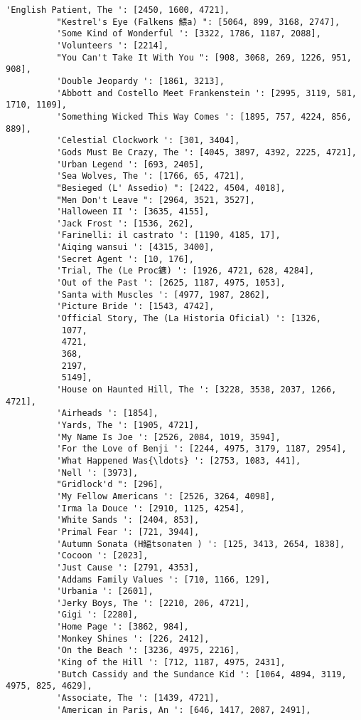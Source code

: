 \documentclass[11pt]{article}
\begin{document}
\begin{Verbatim}[commandchars=\\\{\}]
          'English Patient, The ': [2450, 1600, 4721],
          "Kestrel's Eye (Falkens 鰃a) ": [5064, 899, 3168, 2747],
          'Some Kind of Wonderful ': [3322, 1786, 1187, 2088],
          'Volunteers ': [2214],
          "You Can't Take It With You ": [908, 3068, 269, 1226, 951, 908],
          'Double Jeopardy ': [1861, 3213],
          'Abbott and Costello Meet Frankenstein ': [2995, 3119, 581, 1710, 1109],
          'Something Wicked This Way Comes ': [1895, 757, 4224, 856, 889],
          'Celestial Clockwork ': [301, 3404],
          'Gods Must Be Crazy, The ': [4045, 3897, 4392, 2225, 4721],
          'Urban Legend ': [693, 2405],
          'Sea Wolves, The ': [1766, 65, 4721],
          "Besieged (L' Assedio) ": [2422, 4504, 4018],
          "Men Don't Leave ": [2964, 3521, 3527],
          'Halloween II ': [3635, 4155],
          'Jack Frost ': [1536, 262],
          'Farinelli: il castrato ': [1190, 4185, 17],
          'Aiqing wansui ': [4315, 3400],
          'Secret Agent ': [10, 176],
          'Trial, The (Le Proc鑣) ': [1926, 4721, 628, 4284],
          'Out of the Past ': [2625, 1187, 4975, 1053],
          'Santa with Muscles ': [4977, 1987, 2862],
          'Picture Bride ': [1543, 4742],
          'Official Story, The (La Historia Oficial) ': [1326,
           1077,
           4721,
           368,
           2197,
           5149],
          'House on Haunted Hill, The ': [3228, 3538, 2037, 1266, 4721],
          'Airheads ': [1854],
          'Yards, The ': [1905, 4721],
          'My Name Is Joe ': [2526, 2084, 1019, 3594],
          'For the Love of Benji ': [2244, 4975, 3179, 1187, 2954],
          'What Happened Was{\ldots} ': [2753, 1083, 441],
          'Nell ': [3973],
          "Gridlock'd ": [296],
          'My Fellow Americans ': [2526, 3264, 4098],
          'Irma la Douce ': [2910, 1125, 4254],
          'White Sands ': [2404, 853],
          'Primal Fear ': [721, 3944],
          'Autumn Sonata (H鰏tsonaten ) ': [125, 3413, 2654, 1838],
          'Cocoon ': [2023],
          'Just Cause ': [2791, 4353],
          'Addams Family Values ': [710, 1166, 129],
          'Urbania ': [2601],
          'Jerky Boys, The ': [2210, 206, 4721],
          'Gigi ': [2280],
          'Home Page ': [3862, 984],
          'Monkey Shines ': [226, 2412],
          'On the Beach ': [3236, 4975, 2216],
          'King of the Hill ': [712, 1187, 4975, 2431],
          'Butch Cassidy and the Sundance Kid ': [1064, 4894, 3119, 4975, 825, 4629],
          'Associate, The ': [1439, 4721],
          'American in Paris, An ': [646, 1417, 2087, 2491],

\end{Verbatim}
\end{document}
